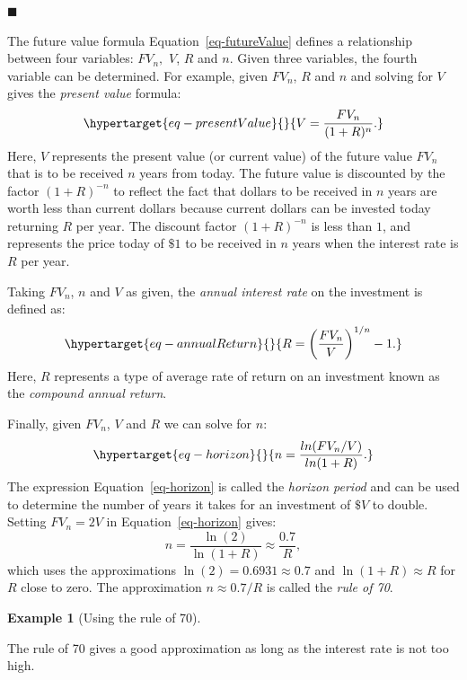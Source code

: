 \documentclass[
  letterpaper,
  DIV=11,
  numbers=noendperiod]{scrreprt}
\theoremstyle{definition}
\theoremstyle{definition}
\newtheorem{example}{Example}[chapter]
\theoremstyle{remark}
\begin{document}
\hfill \(\blacksquare\)

The future value formula Equation~\ref{eq-futureValue} defines a
relationship between four variables: \(FV_{n},\) \(V\), \(R\) and \(n\).
Given three variables, the fourth variable can be determined. For
example, given \(FV_{n}\), \(R\) and \(n\) and solving for \(V\) gives
the \emph{present value}  formula:
\begin{equation}\protect\hypertarget{eq-presentValue}{}{
V=\frac{FV_{n}}{(1+R)^{n}}.
}\label{eq-presentValue}\end{equation} Here, \(V\) represents the
present value (or current value) of the future value \(FV_{n}\) that is
to be received \(n\) years from today. The future value is discounted by
the factor \((1+R)^{-n}\) to reflect the fact that dollars to be
received in \(n\) years are worth less than current dollars because
current dollars can be invested today returning \(R\) per year. The
discount factor \((1+R)^{-n}\) is less than \(1\), and represents the
price today of \(\$1\) to be received in \(n\) years when the interest
rate is \(R\) per year.

Taking \(FV_{n}\), \(n\) and \(V\) as given, the \emph{annual interest
rate} on the investment is defined as:
\begin{equation}\protect\hypertarget{eq-annualReturn}{}{
R=\left(\frac{FV_{n}}{V}\right)^{1/n}-1.
}\label{eq-annualReturn}\end{equation} Here, \(R\) represents a type of
average rate of return on an investment known as the \emph{compound
annual return}.

Finally, given \(FV_{n}\), \(V\) and \(R\) we can solve for \(n\):
\begin{equation}\protect\hypertarget{eq-horizon}{}{
n=\frac{ln(FV_{n}/V)}{ln(1+R)}.
}\label{eq-horizon}\end{equation} The expression
Equation~\ref{eq-horizon} is called the \emph{horizon period} and can be
used to determine the number of years it takes for an investment of
\(\$V\) to double. Setting \(FV_{n}=2V\) in Equation~\ref{eq-horizon}
gives: \[n=\frac{\ln(2)}{\ln(1+R)}\approx\frac{0.7}{R},\] which uses the
approximations \(\ln(2)=0.6931\approx0.7\) and \(\ln(1+R)\approx R\) for
\(R\) close to zero. The approximation \(n\approx0.7/R\) is called the
\emph{rule of 70}.

\begin{example}[Using the rule of
70]\protect\hypertarget{exm-example0102}{}\label{exm-example0102}

 The rule of 70 gives a good approximation as long as
the interest rate is not too high.

\end{example}
\end{document}
